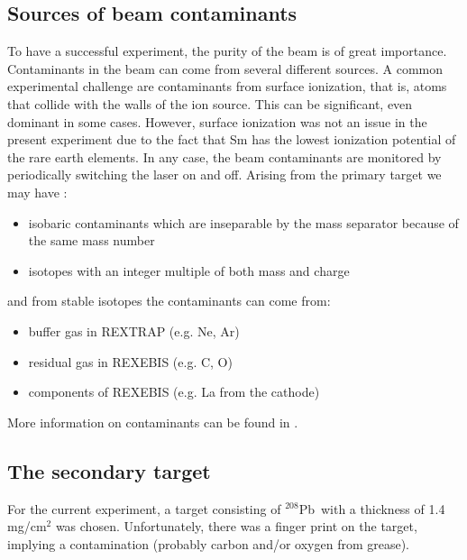\documentclass[twoside,english]{uiofysmaster/uiofysmaster}
\newcommand{\Pb}{$^{208}$Pb}
\begin{document}
\subsection{Sources of beam contaminants}\label{ssec:bcontaminants}
To have a successful experiment, the purity of the beam is of great importance. Contaminants in the beam can come from several different sources. 
A common experimental challenge are contaminants from surface ionization, that is, atoms that collide with the walls of the ion source. 
This can be significant, even dominant in some cases. 
However, surface ionization was not an issue in the present experiment due to the fact that Sm has the lowest ionization potential of the rare earth elements. 
In any case, the beam contaminants are monitored by periodically switching the laser on and off.
Arising from the primary target we may have \cite{MB-spect}:
\begin{itemize}
	\item isobaric contaminants which are inseparable by the mass separator because of the same mass number
	\item isotopes with an integer multiple of both mass and charge
\end{itemize}
and from stable isotopes the contaminants can come from:
\begin{itemize}
	\item buffer gas in REXTRAP (e.g. Ne, Ar)
	\item residual gas in REXEBIS (e.g. C, O)
	\item components of REXEBIS (e.g. La from the cathode)
\end{itemize}
More information on contaminants can be found in \cite{HIE-ISOLDE, RILIS, MB-spect}.


\subsection{The secondary target}\label{ssec:Pb}
For the current experiment, a target consisting of \Pb\ with a thickness of 1.4 mg/cm$^2$ was chosen. 
Unfortunately, there was a finger print on the target, implying a contamination (probably carbon and/or oxygen from grease).
\end{document}
